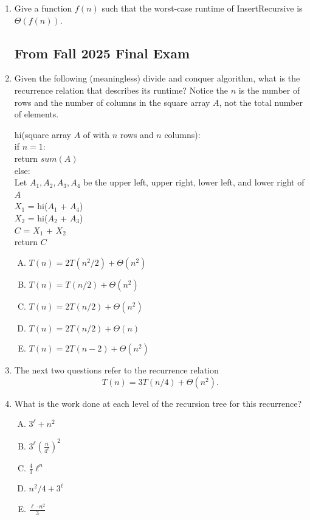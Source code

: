 \documentclass[11pt]{article}
\begin{document}
\begin{enumerate}
\item Give a function $f(n)$ such that the worst-case runtime of
InsertRecursive is $\Theta(f(n))$.



\newpage
\subsection*{From Fall 2025 Final Exam}

\item Given the following (meaningless) divide and conquer algorithm,
what is the recurrence relation that describes its runtime?
Notice the $n$ is the number of rows and the number of columns in the square array $A$,
not the total number of elements.

    \begin{algo}
    hi(square array $A$ of with $n$ rows and $n$ columns): \+ \\
    if $n = 1$:\+\\
        return $sum(A)$\-\\
    else:\+\\
    Let $A_1, A_2, A_3, A_4$ be the upper left, upper right, lower left, and lower right of $A$\\
    $X_1$ = hi($A_1$ + $A_4$)\\
    $X_2$ = hi($A_2$ + $A_3$)\\
    $C$ = $X_1$ + $X_2$\\
    return $C$\-\\
    \end{algo}

\begin{enumerate}[A.]
    \item $T(n) = 2T(n^2/2) + \Theta(n^2)$
    \item $T(n) = T(n/2) + \Theta(n^2)$
    \item $T(n) = 2T(n/2) + \Theta(n^2)$
    \item $T(n) = 2T(n/2) + \Theta(n)$
    \item $T(n) = 2T(n-2) + \Theta(n^2)$
\end{enumerate}

\item[] The next two questions refer to the recurrence relation
\[T(n) = 3T(n/4) + \Theta(n^2).
\]
\item What is the work done at each level of the recursion tree for this recurrence?
\begin{enumerate}[A.]
    \item $3^{\ell} + n^2$
    \item $3^{\ell} \left(\frac{n}{4^\ell}\right)^2$
    \item $\frac{4}{3} \ell^n$
    \item $n^2/4 + 3^\ell$
    \item $\frac{\ell \cdot n^2}{3}$
\end{enumerate}


\end{enumerate}
\end{document}
